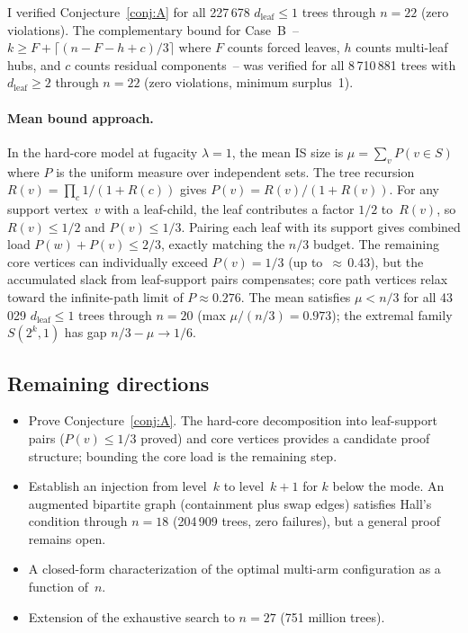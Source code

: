 \documentclass[12pt,oneside]{article}
\theoremstyle{remark}
\begin{document}
I verified Conjecture~\ref{conj:A} for all 227\,678 $d_{\mathrm{leaf}} \le 1$ trees through $n = 22$ (zero violations).
The complementary bound for Case~B~-- $k \ge F + \lceil(n - F - h + c)/3\rceil$ where $F$ counts forced leaves, $h$ counts multi-leaf hubs, and $c$ counts residual components~-- was verified for all 8\,710\,881 trees with $d_{\mathrm{leaf}} \ge 2$ through $n = 22$ (zero violations, minimum surplus~1).

\paragraph*{Mean bound approach.}
In the hard-core model at fugacity $\lambda = 1$, the mean IS size is $\mu = \sum_v P(v \in S)$ where $P$ is the uniform measure over independent sets.
The tree recursion $R(v) = \prod_c 1/(1 + R(c))$ gives $P(v) = R(v)/(1 + R(v))$.
For any support vertex~$v$ with a leaf-child, the leaf contributes a factor $1/2$ to~$R(v)$, so $R(v) \le 1/2$ and $P(v) \le 1/3$.
Pairing each leaf with its support gives combined load $P(w) + P(v) \le 2/3$, exactly matching the $n/3$ budget.
The remaining core vertices can individually exceed $P(v) = 1/3$ (up to~${\approx}\,0.43$), but the accumulated slack from leaf-support pairs compensates; core path vertices relax toward the infinite-path limit of $P \approx 0.276$.
The mean satisfies $\mu < n/3$ for all 43\,029 $d_{\mathrm{leaf}} \le 1$ trees through $n = 20$ (max $\mu/(n/3) = 0.973$); the extremal family $S(2^k, 1)$ has gap $n/3 - \mu \to 1/6$.

\subsection*{Remaining directions}

\begin{itemize}
  \item Prove Conjecture~\ref{conj:A}.
    The hard-core decomposition into leaf-support pairs ($P(v) \le 1/3$ proved) and core vertices provides a candidate proof structure; bounding the core load is the remaining step.
  \item Establish an injection from level~$k$ to level~$k+1$ for $k$ below the mode.
    An augmented bipartite graph (containment plus swap edges) satisfies Hall's condition through $n = 18$ (204\,909 trees, zero failures), but a general proof remains open.
  \item A closed-form characterization of the optimal multi-arm configuration as a function of~$n$.
  \item Extension of the exhaustive search to $n = 27$ (751 million trees).
\end{itemize}
\end{document}
